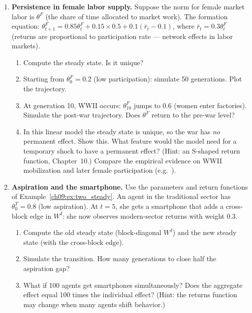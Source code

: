 \documentclass[../structural_economics_book.tex]{subfiles}
\begin{document}
\begin{enumerate}[label=\textbf{9.\arabic*}, leftmargin=3em]
\item \textbf{Persistence in female labor supply.} Suppose the norm for female market labor is $\theta^F$ (the share of time allocated to market work). The formation equation: $\theta^F_{t+1} = 0.85\theta^F_t + 0.15 \times 0.5 + 0.1(\bar{r}_t - 0.1)$, where $\bar{r}_t = 0.3\theta^F_t$ (returns are proportional to participation rate --- network effects in labor markets).
\begin{enumerate}
\item Compute the steady state. Is it unique?
\item Starting from $\theta^F_0 = 0.2$ (low participation): simulate 50 generations. Plot the trajectory.
\item At generation 10, WWII occurs: $\theta^F_{10}$ jumps to 0.6 (women enter factories). Simulate the post-war trajectory. Does $\theta^F$ return to the pre-war level?
\item In this linear model the steady state is unique, so the war has \textit{no} permanent effect. Show this. What feature would the model need for a temporary shock to have a permanent effect? (Hint: an S-shaped return function, Chapter~10.) Compare the empirical evidence on WWII mobilization and later female participation (e.g.\ \citealp[\textit{QJE}, ``Mothers and Sons'']{fernandez2004mothers}).
\end{enumerate}

\item \textbf{Aspiration and the smartphone.} Use the parameters and return functions of Example~\ref{ch09:ex:two_steady}. An agent in the traditional sector has $\theta^T_0 = 0.8$ (low aspiration). At $t = 5$, she gets a smartphone that adds a cross-block edge in $W^I$: she now observes modern-sector returns with weight 0.3.
\begin{enumerate}
\item Compute the old steady state (block-diagonal $W^I$) and the new steady state (with the cross-block edge).
\item Simulate the transition. How many generations to close half the aspiration gap?
\item What if 100 agents get smartphones simultaneously? Does the aggregate effect equal 100 times the individual effect? (Hint: the returns function may change when many agents shift behavior.)
\end{enumerate}


\end{enumerate}
\end{document}
